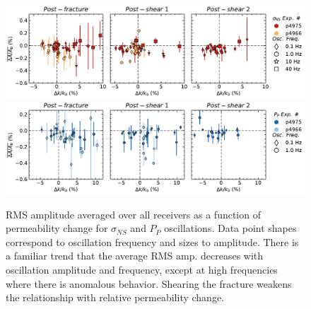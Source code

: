 \documentclass[letterpaper,10pt]{article}
\begin{document}
\begin{figure}[ht]
	\centering
	\includegraphics[width=1\columnwidth]{avg_DelA_perm_NS}
	\includegraphics[width=1\columnwidth]{avg_DelA_perm_PP}
	\caption{RMS amplitude averaged over all receivers as a function of permeability change for $ \sigma_{NS} $ and $ P_P $ oscillations. Data point shapes correspond to oscillation frequency and sizes to amplitude. There is a familiar trend that the average RMS amp. decreases with oscillation amplitude and frequency, except at high frequencies where there is anomalous behavior. Shearing the fracture weakens the relationship with relative permeability change.}
	\label{fig:dela_plots2}
\end{figure}

\clearpage



\end{document}
